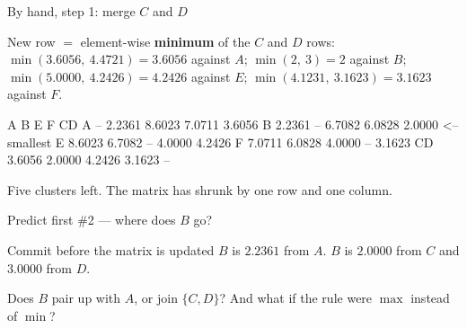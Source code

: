 \documentclass[aspectratio=169]{beamer}
\begin{document}
\begin{frame}[fragile]{By hand, step 1: merge $C$ and $D$}
  \begin{center}\small
  New row $=$ element-wise \textbf{minimum} of the $C$ and $D$ rows:\\
  $\min(3.6056,\ 4.4721) = 3.6056$ against $A$; \quad
  $\min(2,\ 3) = 2$ against $B$; \quad
  $\min(5.0000,\ 4.2426) = 4.2426$ against $E$; \quad
  $\min(4.1231,\ 3.1623) = 3.1623$ against $F$.
  \end{center}
\begin{outblk}
                   A         B         E         F        CD
A                 --    2.2361    8.6023    7.0711    3.6056
B             2.2361        --    6.7082    6.0828    2.0000   <-- smallest
E             8.6023    6.7082        --    4.0000    4.2426
F             7.0711    6.0828    4.0000        --    3.1623
CD            3.6056    2.0000    4.2426    3.1623        --
\end{outblk}
  \begin{center}\small
    Five clusters left. The matrix has shrunk by one row and one column.
  \end{center}
\end{frame}

\begin{frame}{Predict first \#2 --- where does $B$ go?}
  \begin{alertblock}{Commit before the matrix is updated}
    $B$ is $2.2361$ from $A$. $B$ is $2.0000$ from $C$ and $3.0000$ from $D$.

    \medskip
    \centering\large
    Does $B$ pair up with $A$, or join $\{C,D\}$? And what if the rule were
    $\max$ instead of $\min$?
  \end{alertblock}
\end{frame}
\end{document}
